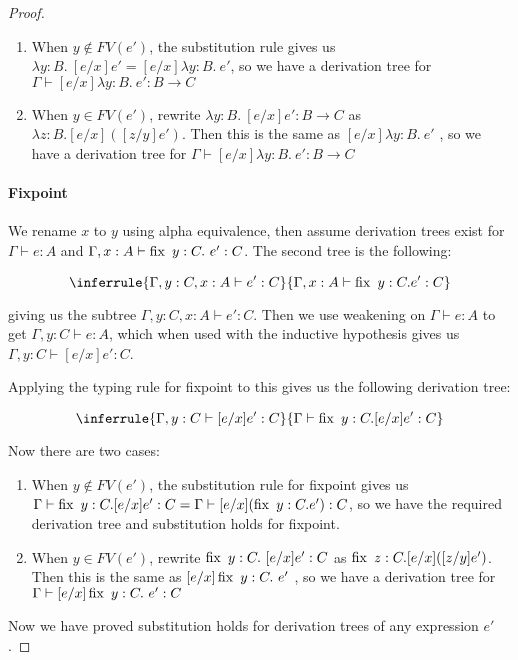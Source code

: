 \begin{proof}
\begin{enumerate}
\item{When $y \notin FV(e')$, the substitution rule gives us $\lambda y:B. \ [e/x]e' = [e/x]\lambda y:B. \ e'$, so we have a derivation tree for $\Gamma \vdash [e/x]\lambda y:B. \ e' : B \to C$}
\item{When $y \in FV(e')$, rewrite $\lambda y:B. \ [e/x]e' : B \to C$ as $\lambda z:B. [e/x]([z/y]e')$. Then this is the same as $[e/x]\lambda y:B. \ e'$ , so we have a derivation tree for $\Gamma \vdash [e/x]\lambda y:B. \ e' : B \to C$} 
\end{enumerate} 


\paragraph{Fixpoint} We rename $x$ to $y$ using alpha equivalence, then assume derivation trees exist for $\Gamma \vdash e : A$ and $\Gamma, x : A \vdash \operatorname{fix} \ y:C. \ e' : C$. The second tree is the following:


$$\inferrule{\Gamma, y:C, x:A \vdash e' : C}{\Gamma,x:A \vdash \fix \ y:C. e' : C}$$

giving us the subtree $\Gamma, y:C, x:A \vdash e' : C$. Then we use weakening on $\Gamma \vdash e : A$ to get $\Gamma, y : C \vdash e : A$, which when used with the inductive hypothesis gives us $\Gamma, y:C \vdash [e/x]e' : C$. 

Applying the typing rule for fixpoint to this gives us the following derivation tree:

$$\inferrule{\Gamma, y:C \vdash [e/x]e' : C}{\Gamma\vdash \fix \ y:C. [e/x]e' : C}$$

Now there are two cases:

\begin{enumerate}
\item{When $y \notin FV(e')$, the substitution rule for fixpoint gives us $\Gamma\vdash \operatorname{fix} \ y:C. [e/x]e' : C = \Gamma \vdash [e/x](\operatorname{fix} \ y:C. e') : C$, so we have the required derivation tree and substitution holds for fixpoint.}
\item{When $y \in FV(e')$, rewrite $\operatorname{fix} \  y:C. \ [e/x]e' : C$ as $\operatorname{fix} \ z:C. [e/x]([z/y]e')$. Then this is the same as $[e/x]\operatorname{fix} \  y:C. \ e'$ , so we have a derivation tree for $\Gamma \vdash [e/x]\operatorname{fix} \  y:C. \ e' : C$}
\end{enumerate}


Now we have proved substitution holds for derivation trees of any expression $e'$.
\end{proof}

